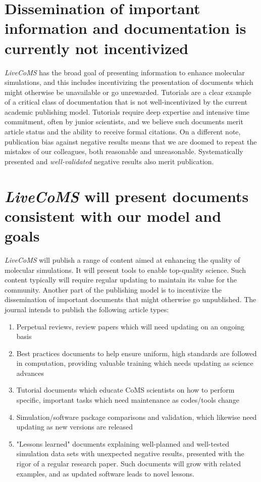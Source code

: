 \documentclass[9pt,editorial]{livecoms}
\begin{document}
\section{Dissemination of important information and documentation is currently not incentivized}
\emph{LiveCoMS} has the broad goal of presenting information to enhance molecular simulations, and this includes incentivizing the presentation of documents which might otherwise be unavailable or go unrewarded.
Tutorials are a clear example of a critical class of documentation that is not well-incentivized by the current academic publishing model.
Tutorials require deep expertise and intensive time commitment, often by junior scientists, and we believe such documents merit article status and the ability to receive formal citations.
On a different note, publication bias against negative results \cite{munafo2017manifesto} means that we are doomed to repeat the mistakes of our colleagues, both reasonable and unreasonable.
Systematically presented and \emph{well-validated} negative results also merit publication.

\section{\emph{LiveCoMS} will present documents consistent with our model and goals}

\emph{LiveCoMS} will publish a range of content aimed at enhancing the quality of molecular simulations.  
It will present tools to enable top-quality science.  
Such content typically will require regular updating to maintain its value for the community.  
Another part of the publishing model is to incentivize the dissemination of important documents that might otherwise go unpublished. 
The journal intends to publish the following article types:

\begin{enumerate}
\item Perpetual reviews, review papers which will need updating on an ongoing basis
\item Best practices documents to help ensure uniform, high standards are followed in computation, providing valuable training which needs updating as science advances
\item Tutorial documents which educate CoMS scientists on how to perform specific, important tasks which need maintenance as codes/tools change
\item Simulation/software package comparisons and validation, which likewise need updating as new versions are released
\item "Lessons learned" documents explaining well-planned and well-tested simulation data sets with unexpected negative results, presented with the rigor of a regular research paper.  Such documents will grow with related examples, and as updated software leads to novel lessons.
\end{enumerate}
\end{document}
